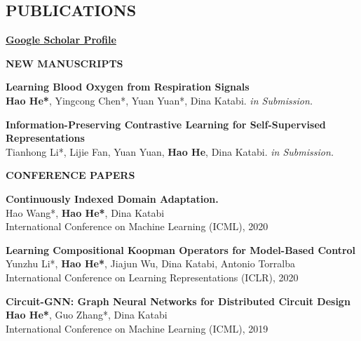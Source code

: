 \documentclass[margin]{res}
\newcommand{\Bullet}[1]{{\raisebox{0.25ex}{\tiny$\bullet$\ }}{#1}\\}
\begin{document}
\begin{resume}

\section{PUBLICATIONS}
\href{https://scholar.google.com/citations?user=v1sUoqwAAAAJ&hl=en&oi=ao}{\textbf{Google Scholar Profile}}

\textbf{NEW MANUSCRIPTS}

\textbf{Learning Blood Oxygen from Respiration Signals}\\
\textbf{Hao He*}, Yingcong Chen*, Yuan Yuan*, Dina Katabi. \emph{in Submission.}

\small{\textbf{Information-Preserving Contrastive Learning for Self-Supervised Representations}}\\
Tianhong Li*, Lijie Fan, Yuan Yuan, \textbf{Hao He}, Dina Katabi. \emph{in Submission.}

\textbf{CONFERENCE PAPERS}

\textbf{Continuously Indexed Domain Adaptation.}\\
Hao Wang*, \textbf{Hao He*}, Dina Katabi\\
International Conference on Machine Learning (ICML), 2020

\textbf{Learning Compositional Koopman Operators for Model-Based Control}\\
Yunzhu Li*, \textbf{Hao He*}, Jiajun Wu, Dina Katabi, Antonio Torralba\\
International Conference on Learning Representations (ICLR), 2020

\textbf{Circuit-GNN: Graph Neural Networks for Distributed Circuit Design}\\
\textbf{Hao He*}, Guo Zhang*, Dina Katabi\\
International Conference on Machine Learning (ICML), 2019


\end{resume}
\end{document}

